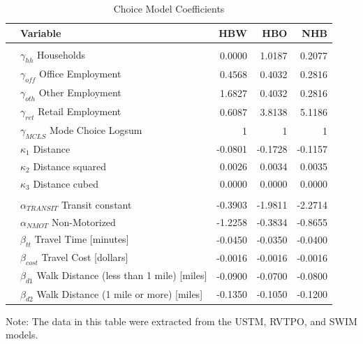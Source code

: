 \begin{table}

\caption{\label{tab:coeffs}Choice Model Coefficients}
\centering
\begin{tabular}[t]{llrrr}
\toprule
 & Variable & HBW & HBO & NHB\\
\midrule
\addlinespace[0.3em]
\multicolumn{5}{l}{\textbf{Destination Choice}}\\
\hspace{1em} & $\gamma_{hh}$ Households & 0.0000 & 1.0187 & 0.2077\\
\hspace{1em} & $\gamma_{off}$ Office Employment & 0.4568 & 0.4032 & 0.2816\\
\hspace{1em} & $\gamma_{oth}$ Other Employment & 1.6827 & 0.4032 & 0.2816\\
\hspace{1em} & $\gamma_{ret}$ Retail Employment & 0.6087 & 3.8138 & 5.1186\\
\hspace{1em} & $\gamma_{MCLS}$ Mode Choice Logsum & 1 & 1 & 1\\
\hspace{1em} & $\kappa_1$ Distance & -0.0801 & -0.1728 & -0.1157\\
\hspace{1em} & $\kappa_2$ Distance squared & 0.0026 & 0.0034 & 0.0035\\
\hspace{1em} & $\kappa_3$ Distance cubed & 0.0000 & 0.0000 & 0.0000\\
\cmidrule{1-5}
\addlinespace[0.3em]
\multicolumn{5}{l}{\textbf{Mode Choice}}\\

\hspace{1em} & $\alpha_{TRANSIT}$ Transit constant & -0.3903 & -1.9811 & -2.2714\\
\hspace{1em} & $\alpha_{NMOT}$ Non-Motorized & -1.2258 & -0.3834 & -0.8655\\
\hspace{1em} & $\beta_{tt}$ Travel Time [minutes] & -0.0450 & -0.0350 & -0.0400\\
\hspace{1em} & $\beta_{cost}$ Travel Cost [dollars] & -0.0016 & -0.0016 & -0.0016\\
\hspace{1em} & $\beta_{d1}$ Walk Distance (less than 1 mile) [miles] & -0.0900 & -0.0700 & -0.0800\\
\hspace{1em} & $\beta_{d2}$ Walk Distance (1 mile or more) [miles] & -0.1350 & -0.1050 & -0.1200\\
\bottomrule
\end{tabular}
\begin{tablenotes}
      \small
      \item Note: The data in this table were extracted from the USTM, RVTPO, and SWIM models.
    \end{tablenotes}
\end{table}


